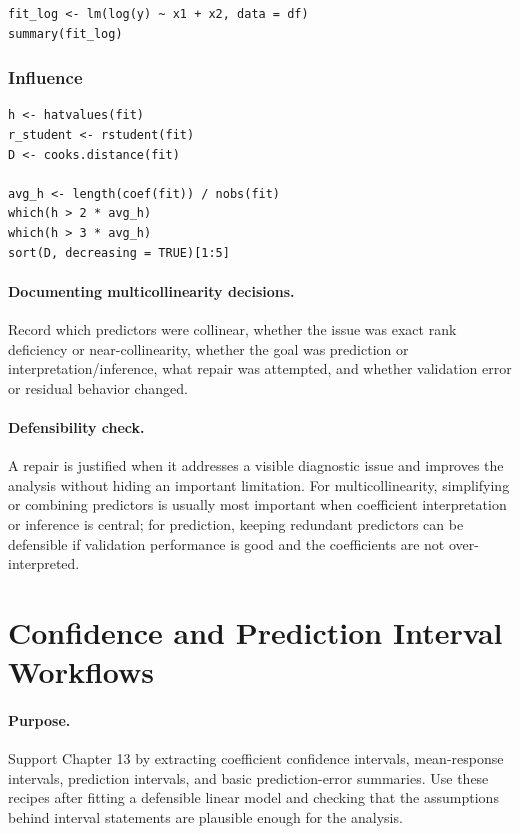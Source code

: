 \begin{verbatim}
fit_log <- lm(log(y) ~ x1 + x2, data = df)
summary(fit_log)
\end{verbatim}

\subsubsection*{Influence}

\begin{verbatim}
h <- hatvalues(fit)
r_student <- rstudent(fit)
D <- cooks.distance(fit)

avg_h <- length(coef(fit)) / nobs(fit)
which(h > 2 * avg_h)
which(h > 3 * avg_h)
sort(D, decreasing = TRUE)[1:5]
\end{verbatim}

\paragraph{Documenting multicollinearity decisions.} Record which predictors were collinear, whether the issue was exact rank deficiency or near-collinearity, whether the goal was prediction or interpretation/inference, what repair was attempted, and whether validation error or residual behavior changed.

\paragraph{Defensibility check.} A repair is justified when it addresses a visible diagnostic issue and improves the analysis without hiding an important limitation.  For multicollinearity, simplifying or combining predictors is usually most important when coefficient interpretation or inference is central; for prediction, keeping redundant predictors can be defensible if validation performance is good and the coefficients are not over-interpreted.



\section{Confidence and Prediction Interval Workflows}
\label{app:cookbook-confidence-prediction-intervals}

\paragraph{Purpose.} Support Chapter 13 by extracting coefficient confidence intervals, mean-response intervals, prediction intervals, and basic prediction-error summaries.  Use these recipes after fitting a defensible linear model and checking that the assumptions behind interval statements are plausible enough for the analysis.

